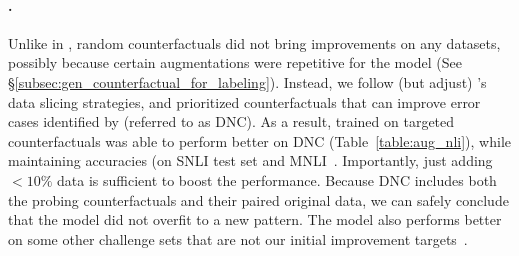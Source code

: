 \paragraph{\nli.}
Unlike in \sst, random counterfactuals did not bring improvements on any datasets, possibly because certain augmentations were repetitive for the model (See \S\ref{subsec:gen_counterfactual_for_labeling}).
Instead, we follow (but adjust) \citet{chen2019slice}'s data slicing strategies, and prioritized counterfactuals that can improve error cases identified by \citet{kim2019probing} (referred to as DNC).
As a result, \maug trained on targeted counterfactuals was able to perform better on DNC (Table~\ref{table:aug_nli}), while maintaining accuracies (on SNLI test set and MNLI~\cite{williams-etal-2018-broad}.
Importantly, just adding $<10\%$ data is sufficient to boost the performance.
Because DNC includes both the probing counterfactuals and their paired original data, we can safely conclude that the model did not overfit to a new pattern.
The model also performs better on some other challenge sets that are not our initial improvement targets~\cite{naik2018stress, glockner-etal-2018-breaking, wang2018glue}.

\TableAugQQP

